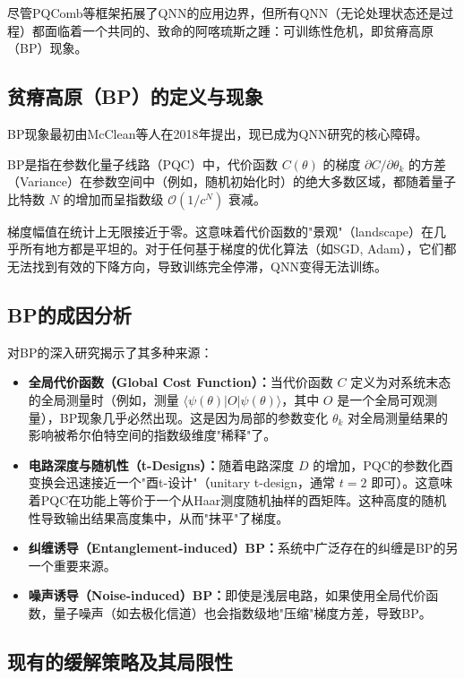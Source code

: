\documentclass[12pt,a4paper]{article}
\begin{document}
尽管PQComb等框架拓展了QNN的应用边界，但所有QNN（无论处理状态还是过程）都面临着一个共同的、致命的阿喀琉斯之踵：可训练性危机，即贫瘠高原（BP）现象。

\subsection{贫瘠高原（BP）的定义与现象}

BP现象最初由McClean等人在2018年提出，现已成为QNN研究的核心障碍。

BP是指在参数化量子线路（PQC）中，代价函数 $C(\theta)$ 的梯度 $\partial C / \partial \theta_k$ 的方差（Variance）在参数空间中（例如，随机初始化时）的绝大多数区域，都随着量子比特数 $N$ 的增加而呈指数级 $\mathcal{O}(1/c^N)$ 衰减。

梯度幅值在统计上无限接近于零。这意味着代价函数的"景观"（landscape）在几乎所有地方都是平坦的。对于任何基于梯度的优化算法（如SGD, Adam），它们都无法找到有效的下降方向，导致训练完全停滞，QNN变得无法训练。

\subsection{BP的成因分析}

对BP的深入研究揭示了其多种来源：

\begin{itemize}
\item \textbf{全局代价函数（Global Cost Function）：}当代价函数 $C$ 定义为对系统末态的全局测量时（例如，测量 $\langle \psi(\theta) | O | \psi(\theta) \rangle$，其中 $O$ 是一个全局可观测量），BP现象几乎必然出现。这是因为局部的参数变化 $\theta_k$ 对全局测量结果的影响被希尔伯特空间的指数级维度"稀释"了。

\item \textbf{电路深度与随机性（t-Designs）：}随着电路深度 $D$ 的增加，PQC的参数化酉变换会迅速接近一个"酉t-设计"（unitary t-design，通常 $t=2$ 即可）。这意味着PQC在功能上等价于一个从Haar测度随机抽样的酉矩阵。这种高度的随机性导致输出结果高度集中，从而"抹平"了梯度。

\item \textbf{纠缠诱导（Entanglement-induced）BP：}系统中广泛存在的纠缠是BP的另一个重要来源。

\item \textbf{噪声诱导（Noise-induced）BP：}即使是浅层电路，如果使用全局代价函数，量子噪声（如去极化信道）也会指数级地"压缩"梯度方差，导致BP。
\end{itemize}

\subsection{现有的缓解策略及其局限性}
\end{document}
